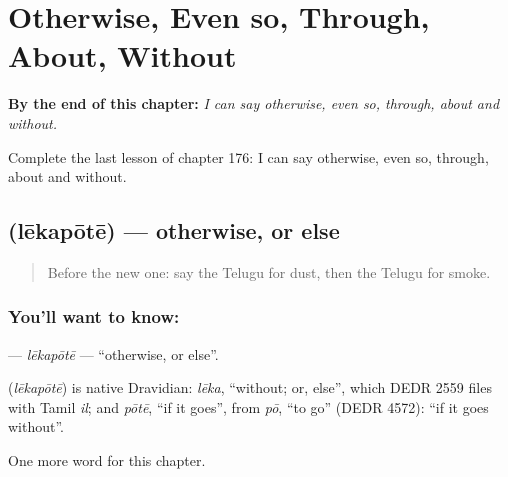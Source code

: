 
\chapter{Otherwise, Even so, Through, About, Without}
\label{ch:te-otherwise-even-so-through-about-without}

\begin{chapteropening}
\textbf{By the end of this chapter:} \emph{I can say otherwise, even so, through, about and without.}

Complete the last lesson of chapter 176: I can say otherwise, even so, through, about and without.
\end{chapteropening}

\section[\texorpdfstring{\te{లేకపోతే} (lēkapōtē)}{లేకపోతే (lēkapōtē)}]{ (lēkapōtē) — otherwise, or else}

\label{lesson:TE-C176-lekapote}



\begin{quote}
Before the new one: say the Telugu for dust, then the Telugu for smoke.
\end{quote}

\subsection*{You'll want to know: }
\textbf{} — \emph{lēkapōtē} — \textquotedblleft{}otherwise, or else\textquotedblright{}.

\begin{cousinweb}
\textbf{} (\emph{lēkapōtē}) is native Dravidian: \emph{lēka}, \textquotedblleft{}without; or, else\textquotedblright{}, which DEDR 2559 files with Tamil \emph{il}; and \emph{pōtē}, \textquotedblleft{}if it goes\textquotedblright{}, from \emph{pō}, \textquotedblleft{}to go\textquotedblright{} (DEDR 4572): \textquotedblleft{}if it goes without\textquotedblright{}.
\end{cousinweb}

\begin{grammarlens}[title={What you've built}]
One more word for this chapter.
\end{grammarlens}

